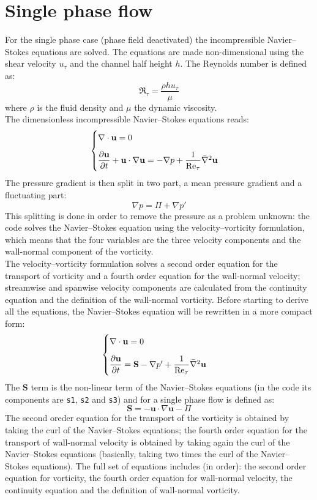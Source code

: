 \section{Single phase flow}
For the single phase case (phase field deactivated) the incompressible Navier--Stokes equations are solved. The equations are made non-dimensional using the shear velocity $u_\tau$ and the channel half height $h$. The Reynolds number is defined as:
\[
\Re_\tau=\frac{\rho h u_\tau}{\mu}
\]
where $\rho$ is the fluid density and $\mu$ the dynamic viscosity.\\
The dimensionless incompressible Navier--Stokes equations reads:
\begin{equation}
\begin{cases}
\nabla\cdot \mathbf{u}=0\\[2ex]
\dfrac{\partial \mathbf{u}}{\partial t}+\mathbf{u}\cdot\nabla \mathbf{u}=-\nabla p+\dfrac{1}{\textnormal{Re}_\tau}\bar\nabla^2\mathbf{u}
\end{cases}
\end{equation}
The pressure gradient is then split in two part, a mean pressure gradient and a fluctuating part:
\[
\nabla p=\Pi+\nabla p'
\]
This splitting is done in order to remove the pressure as a problem unknown: the code solves the Navier--Stokes equation using the velocity--vorticity formulation, which means that the four variables are the three velocity components and the wall-normal component of the vorticity.\\
The velocity--vorticity formulation solves a second order equation for the transport of vorticity and a fourth order equation for the wall-normal velocity; streamwise and spanwise velocity components are calculated from the continuity equation and the definition of the wall-normal vorticity. Before starting to derive all the equations, the Navier--Stokes equation will be rewritten in a more compact form:
\[
\begin{cases}
\nabla\cdot \mathbf{u}=0\\[2ex]
\dfrac{\partial \mathbf{u}}{\partial t}=\mathbf{S}-\nabla p'+\dfrac{1}{\textnormal{Re}_\tau}\bar\nabla^2\mathbf{u}
\end{cases}
\]
The $\mathbf{S}$ term is the non-linear term of the Navier--Stokes equations (in the code its components are \texttt{s1}, \texttt{s2} and \texttt{s3}) and for a single phase flow is defined as:
\[
\mathbf{S}=-\mathbf{u}\cdot\nabla \mathbf{u}-\Pi
\]
The second oreder equation for the transport of the vorticity is obtained by taking the curl of the Navier--Stokes equations; the fourth order equation for the transport of wall-normal velocity is obtained by taking again the curl of the Navier--Stokes equations (basically, taking two times the curl of the Navier--Stokes equations). The full set of equations includes (in order): the second order equation for vorticity, the fourth order equation for wall-normal velocity, the continuity equation and the definition of wall-normal vorticity.
